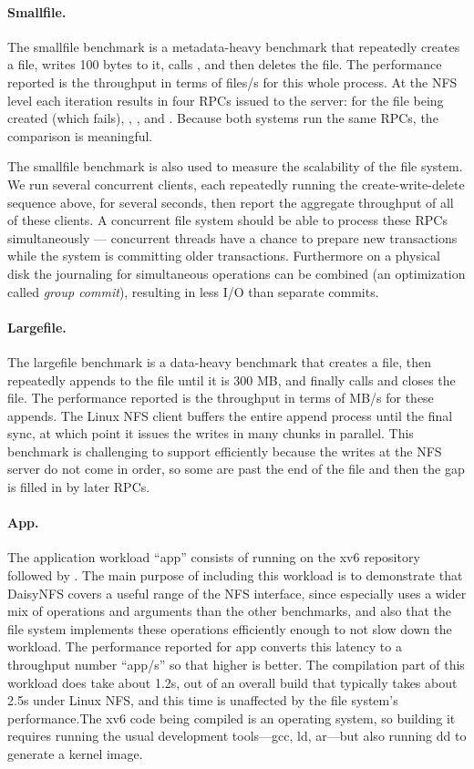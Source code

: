 \paragraph{Smallfile.}
The smallfile benchmark is a metadata-heavy benchmark that repeatedly creates a
file, writes 100 bytes to it, calls , and then deletes the file. The
performance reported is the throughput in terms of files/s for this whole process. At
the NFS level each iteration results in four RPCs issued to the server:  for the file
being created (which fails), , , and . Because
both systems run the same RPCs, the comparison is meaningful.

The smallfile benchmark is also used to measure the scalability of the file
system. We run several concurrent clients, each repeatedly running the
create-write-delete sequence above, for several seconds, then report the
aggregate throughput of all of these clients. A concurrent file system should be
able to process these RPCs simultaneously --- concurrent threads have a chance
to prepare new transactions while the system is committing older transactions.
Furthermore on a physical disk the journaling for simultaneous operations can be
combined (an optimization called \emph{group commit}), resulting in less I/O
than separate commits.

\paragraph{Largefile.}
The largefile benchmark is a data-heavy benchmark that creates a file, then
repeatedly appends to the file until it is 300 MB, and finally calls
 and closes the file. The performance reported is the throughput in
terms of MB/s for these appends. The Linux NFS client buffers the entire append
process until the final sync, at which point it issues the writes in many chunks
in parallel. This benchmark is challenging to support efficiently because the
writes at the NFS server do not come in order, so some are past the end of the
file and then the gap is filled in by later RPCs.

\paragraph{App.}
The application workload ``app'' consists of running  on the xv6
repository followed by . The main purpose of including this workload is to
demonstrate that DaisyNFS covers a useful range of the NFS interface, since
 especially uses a wider mix of operations and arguments than the
other benchmarks, and also that the file system implements these operations
efficiently enough to not slow down the workload. The performance reported for
app converts this latency to a throughput number ``app/s'' so that higher is
better. The compilation part of this workload does take about 1.2s, out of an
overall build that typically takes about 2.5s under Linux NFS, and this time is
unaffected by the file system's performance.\@ The xv6 code being compiled is an
operating system, so building it requires running the usual development
tools---gcc, ld, ar---but also running dd to generate a kernel image.

